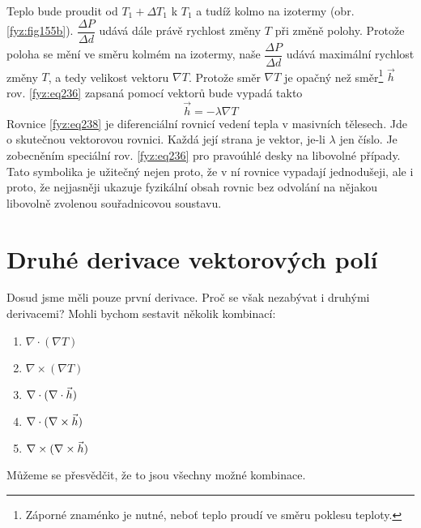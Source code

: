 {    Teplo bude proudit od $T_1+\Delta T_1$ k $T_1$ a tudíž kolmo na izotermy (obr. 
    \ref{fyz:fig155b}). $\dfrac{\Delta P}{\Delta d}$ udává dále právě rychlost změny $T$ 
    při změně polohy. Protože poloha se mění ve směru kolmém na izotermy, naše $\dfrac{\Delta 
    P}{\Delta d}$ udává maximální rychlost změny $T$, a tedy velikost vektoru $\nabla T$. Protože 
    směr $\nabla T$ je opačný než směr\footnote{Záporné znaménko je nutné, neboť teplo proudí ve  
    směru poklesu teploty.} $\vec{h}$  rov. \ref{fyz:eq236} zapsaná pomocí vektorů 
    bude vypadá takto
    \begin{equation}\label{fyz:eq238}
      \vec{h}=-\lambda\nabla T
    \end{equation}
    Rovnice \ref{fyz:eq238} je diferenciální rovnicí vedení tepla v masivních 
    tělesech. Jde o skutečnou vektorovou rovnici. Každá její strana je vektor, je-li $\lambda$ jen 
    číslo. Je zobecněním speciální rov. \ref{fyz:eq236} pro pravoúhlé desky na 
    libovolné případy. Tato symbolika je užitečný nejen proto, že v ní rovnice vypadají 
    jednodušeji, ale i proto, že nejjasněji ukazuje fyzikální obsah rovnic bez odvolání na nějakou 
    libovolně zvolenou souřadnicovou soustavu.      
    
  \section{Druhé derivace vektorových polí}\label{sec:fey_diff_2deriv}
    \cite[s.~39]{Feynman02} Dosud jsme měli pouze první derivace. Proč se však nezabývat i druhými
    derivacemi? Mohli bychom sestavit několik kombinací:
    \begin{enumerate}[leftmargin=2cm,rightmargin=2cm, label=\emph{\alph*})]
      \setlength{\itemsep}{0cm}%
      \setlength{\parskip}{0em}%
      \item $\nabla\cdot(\nabla T)$
      \item $\nabla\times(\nabla T)$
      \item $\nabla\cdot(\nabla\cdot\vec{h})$
      \item $\nabla\cdot(\nabla\times\vec{h})$
      \item $\nabla\times(\nabla\times\vec{h})$
    \end{enumerate}
    Můžeme se přesvědčit, že to jsou všechny možné kombinace.
  
}
